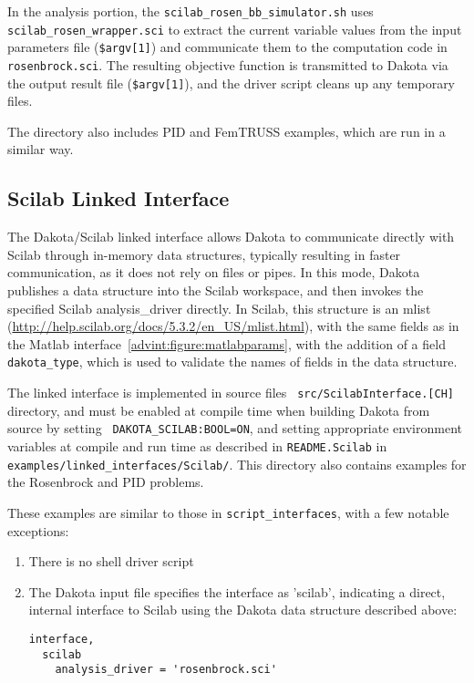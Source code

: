 In the analysis portion, the \texttt{scilab\_rosen\_bb\_simulator.sh}
uses \texttt{scilab\_rosen\_wrapper.sci} to extract the current
variable values from the input parameters file (\texttt{\$argv[1]})
and communicate them to the computation code in
\texttt{rosenbrock.sci}.  The resulting objective function is
transmitted to Dakota via the output result file (\texttt{\$argv[1]}),
and the driver script cleans up any temporary files.

The directory also includes PID and FemTRUSS examples, which are run
in a similar way.

\subsection{Scilab Linked Interface} 

The Dakota/Scilab linked interface allows Dakota to communicate
directly with Scilab through in-memory data structures, typically
resulting in faster communication, as it does not rely on files or
pipes.  In this mode, Dakota publishes a data structure into the
Scilab workspace, and then invokes the specified Scilab
analysis\_driver directly.  In Scilab, this structure is an mlist
(\url{http://help.scilab.org/docs/5.3.2/en\_US/mlist.html}), with the same
fields as in the Matlab interface~\ref{advint:figure:matlabparams},
with the addition of a field {\tt dakota\_type}, which is used to validate
the names of fields in the data structure.

The linked interface is implemented in source files {\tt
  src/ScilabInterface.[CH]} directory, and must be enabled at compile
time when building Dakota from source by setting {\tt
  DAKOTA\_SCILAB:BOOL=ON}, and setting appropriate environment
variables at compile and run time as described in {\tt README.Scilab}
in \\ {\tt examples/linked\_interfaces/Scilab/}.  This directory also
contains examples for the Rosenbrock and PID problems.

These examples are similar to those in {\tt script\_interfaces}, with
a few notable exceptions:
\begin{enumerate}
\item There is no shell driver script
\item The Dakota input file specifies the interface as 'scilab',
  indicating a direct, internal interface to Scilab using the Dakota
  data structure described above:
\begin{small}
\begin{verbatim}
interface,
  scilab
    analysis_driver = 'rosenbrock.sci'
\end{verbatim} 
\end{small}
\end{enumerate}


